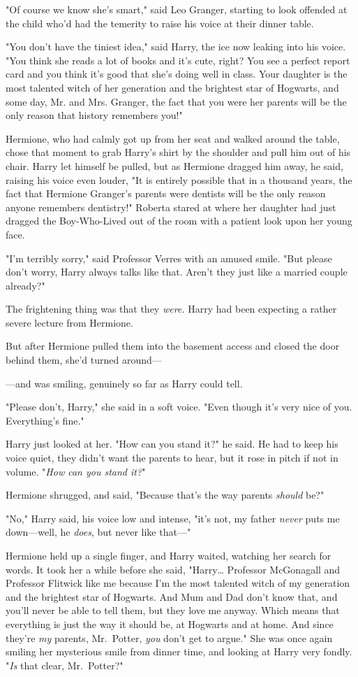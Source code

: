 "Of course we know she's smart," said Leo Granger, starting to look offended at
the child who'd had the temerity to raise his voice at their dinner table.

"You don't have the tiniest idea," said Harry, the ice now leaking into his
voice. "You think she reads a lot of books and it's cute, right? You see a
perfect report card and you think it's good that she's doing well in class.
Your daughter is the most talented witch of her generation and the brightest
star of Hogwarts, and some day, Mr. and Mrs. Granger, the fact that you were her
parents will be the only reason that history remembers you!"

Hermione, who had calmly got up from her seat and walked around the table,
chose that moment to grab Harry's shirt by the shoulder and pull him out of his
chair. Harry let himself be pulled, but as Hermione dragged him away, he said,
raising his voice even louder, "It is entirely possible that in a thousand
years, the fact that Hermione Granger's parents were dentists will be the only
reason anyone remembers dentistry!"
\later
Roberta stared at where her daughter had just dragged the Boy-Who-Lived out of
the room with a patient look upon her young face.

"I'm terribly sorry," said Professor Verres with an amused smile. "But please
don't worry, Harry always talks like that. Aren't they just like a married
couple already?"

The frightening thing was that they \emph{were.}
\later
Harry had been expecting a rather severe lecture from Hermione.

But after Hermione pulled them into the basement access and closed the door
behind them, she'd turned around---

---and was smiling, genuinely so far as Harry could tell.

"Please don't, Harry," she said in a soft voice. "Even though it's very nice of
you. Everything's fine."

Harry just looked at her. "How can you stand it?" he said. He had to keep his
voice quiet, they didn't want the parents to hear, but it rose in pitch if not
in volume. "\emph{How can you stand it?}"

Hermione shrugged, and said, "Because that's the way parents \emph{should} be?"

"No," Harry said, his voice low and intense, "it's not, my father \emph{never}
puts me down---well, he \emph{does}, but never like that---"

Hermione held up a single finger, and Harry waited, watching her search for
words. It took her a while before she said, "Harry{\ldots} Professor McGonagall
and Professor Flitwick like me because I'm the most talented witch of my
generation and the brightest star of Hogwarts. And Mum and Dad don't know that,
and you'll never be able to tell them, but they love me anyway. Which means
that everything is just the way it should be, at Hogwarts and at home. And
since they're \emph{my} parents, Mr.~Potter, \emph{you} don't get to argue."
She was once again smiling her mysterious smile from dinner time, and looking at
Harry very fondly. "\emph{Is} that clear, Mr.~Potter?"

